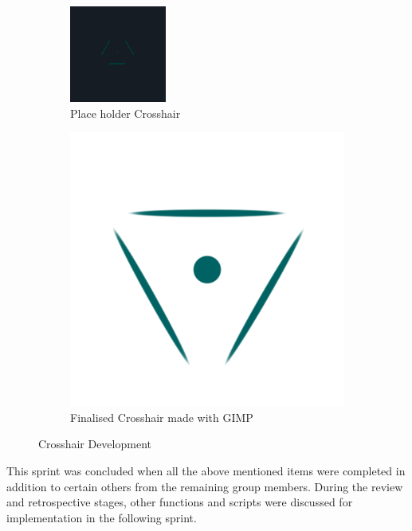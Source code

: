 \begin{figure}[H]
\centering
\begin{subfigure}{0.5\textwidth}
  \centering
  \includegraphics[scale=1.4]{Figures/crossold.png}
  \caption{Place holder Crosshair}
\end{subfigure}%
\begin{subfigure}{0.5\textwidth}
  \centering
  \includegraphics[scale=1]{Figures/crosshair.png}
  \caption{Finalised Crosshair made with GIMP}
\end{subfigure}
\caption{Crosshair Development}
\label{cross}
\end{figure}

\noindent This sprint was concluded when all the above mentioned items were completed in addition to certain others from the remaining group members. During the review and retrospective stages, other functions and scripts were discussed for implementation in the following sprint.

